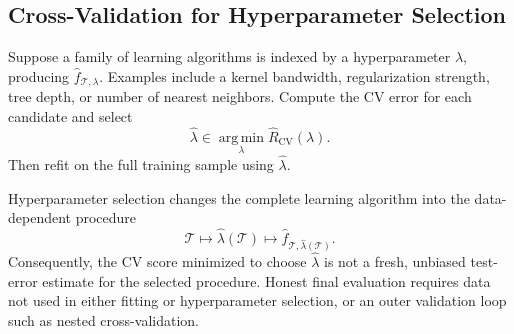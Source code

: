 \documentclass[12pt,oneside]{book}
\numberwithin{equation}{section}
\theoremstyle{definition}
\theoremstyle{plain}
\theoremstyle{remark}
\newcommand{\argmin}{\operatorname*{arg\,min}}
\begin{document}
\subsection{Cross-Validation for Hyperparameter Selection}
Suppose a family of learning algorithms is indexed by a hyperparameter
$\lambda$, producing $\widehat f_{\mathcal{T},\lambda}$. Examples include a
kernel bandwidth, regularization strength, tree depth, or number of nearest
neighbors. Compute the CV error for each candidate and select
\[
\widehat\lambda
\in\argmin_\lambda\widehat R_{\mathrm{CV}}(\lambda).
\]
Then refit on the full training sample using $\widehat\lambda$.

Hyperparameter selection changes the complete learning algorithm into the
data-dependent procedure
\[
\mathcal{T}\longmapsto\widehat\lambda(\mathcal{T})
\longmapsto
\widehat f_{\mathcal{T},\widehat\lambda(\mathcal{T})}.
\]
Consequently, the CV score minimized to choose $\widehat\lambda$ is not a fresh,
unbiased test-error estimate for the selected procedure. Honest final
evaluation requires data not used in either fitting or hyperparameter
selection, or an outer validation loop such as nested cross-validation.
\end{document}
